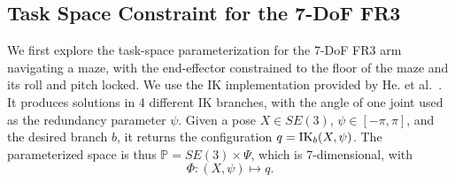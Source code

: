 \documentclass[letterpaper, 10 pt, conference]{ieeeconf}
\begin{document}



\subsection{Task Space Constraint for the 7-DoF FR3}








We first explore the task-space parameterization for the 7-DoF FR3 arm navigating a maze, with the end-effector constrained to the floor of the maze and its roll and pitch locked. We use the IK implementation provided by He. et al.~\cite{franka_ik2021}. It produces solutions in 4 different IK branches, with the angle of one joint used as the redundancy parameter $\psi$. Given a pose $X \in SE(3)$, $\psi \in [-\pi, \pi]$, and the desired branch $b$, it returns the configuration $q = \operatorname{IK}_b(X, \psi)$. The parameterized space is thus $\mathbb{P} = SE(3) \times \Psi$, which is 7-dimensional, with
\[
    \Phi : (X, \psi) \mapsto q.
\]
\end{document}

